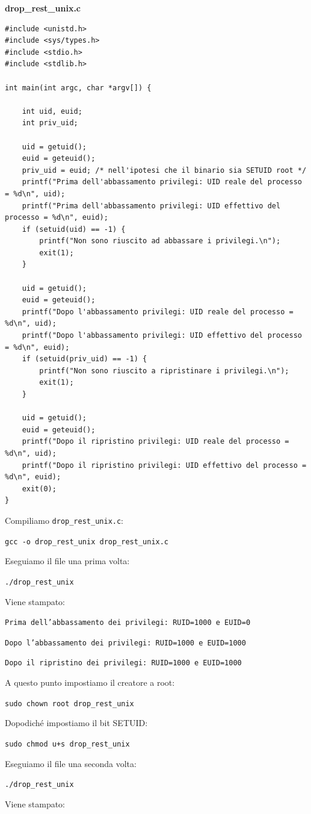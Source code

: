 \begin{mdframed}[backgroundcolor=white!20,shadow=false]
\textbf{drop\_rest\_unix.c}

\begin{verbatim}
#include <unistd.h>
#include <sys/types.h>
#include <stdio.h>
#include <stdlib.h>

int main(int argc, char *argv[]) {

	int uid, euid;
	int priv_uid;

	uid = getuid();
	euid = geteuid();
	priv_uid = euid; /* nell'ipotesi che il binario sia SETUID root */
	printf("Prima dell'abbassamento privilegi: UID reale del processo = %d\n", uid);
	printf("Prima dell'abbassamento privilegi: UID effettivo del processo = %d\n", euid);
	if (setuid(uid) == -1) {
		printf("Non sono riuscito ad abbassare i privilegi.\n");
		exit(1);
	}

	uid = getuid();
	euid = geteuid();
	printf("Dopo l'abbassamento privilegi: UID reale del processo = %d\n", uid);
	printf("Dopo l'abbassamento privilegi: UID effettivo del processo = %d\n", euid);
	if (setuid(priv_uid) == -1) {
		printf("Non sono riuscito a ripristinare i privilegi.\n");
		exit(1);
	}

	uid = getuid();
	euid = geteuid();
	printf("Dopo il ripristino privilegi: UID reale del processo = %d\n", uid);
	printf("Dopo il ripristino privilegi: UID effettivo del processo = %d\n", euid);
	exit(0);
}

\end{verbatim}

\end{mdframed}

Compiliamo \texttt{drop\_rest\_unix.c}:

\begin{center}
    \texttt{gcc -o drop\_rest\_unix drop\_rest\_unix.c}
\end{center}
Eseguiamo il file una prima volta:
\begin{center}
    \texttt{./drop\_rest\_unix}
\end{center}
Viene stampato:

\texttt{Prima dell’abbassamento dei privilegi:
 RUID=1000 e EUID=0}
 
 \texttt{Dopo l’abbassamento dei privilegi:
 RUID=1000 e EUID=1000}
 
\texttt{Dopo il ripristino dei privilegi:
 RUID=1000 e EUID=1000}
 
A questo punto impostiamo il creatore a root:
\begin{center}
    \texttt{sudo chown root drop\_rest\_unix}
\end{center}
Dopodiché impostiamo il bit SETUID:
\begin{center}
    \texttt{sudo chmod u+s drop\_rest\_unix}
\end{center}
Eseguiamo il file una seconda volta:
\begin{center}
    \texttt{./drop\_rest\_unix}
\end{center}
Viene stampato:

